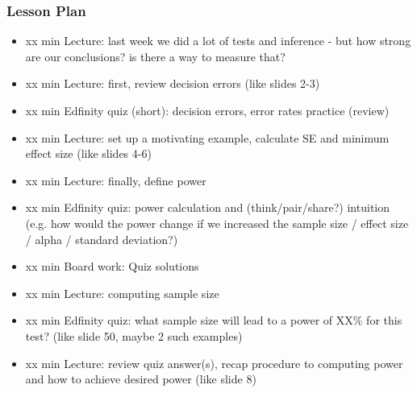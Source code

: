 \begin{frame}
    \frametitle{Lesson Plan}
    \begin{itemize}
        \item xx min Lecture: last week we did a lot of tests and inference - but how strong are our conclusions? is there a way to measure that?
        \item xx min Lecture: first, review decision errors (like slides 2-3)
        \item xx min Edfinity quiz (short): decision errors, error rates practice (review)
        \item xx min Lecture: set up a motivating example, calculate SE and minimum effect size (like slides 4-6)
        \item xx min Lecture: finally, define power
        \item xx min Edfinity quiz: power calculation and (think/pair/share?) intuition (e.g. how would the power change if we increased the sample size / effect size / alpha / standard deviation?)
        \item xx min Board work: Quiz solutions
        \item xx min Lecture: computing sample size
        \item xx min Edfinity quiz: what sample size will lead to a power of XX\% for this test? (like slide 50, maybe 2 such examples) 
        \item xx min Lecture: review quiz answer(s), recap procedure to computing power and how to achieve desired power (like slide 8)
    \end{itemize}
\end{frame}

